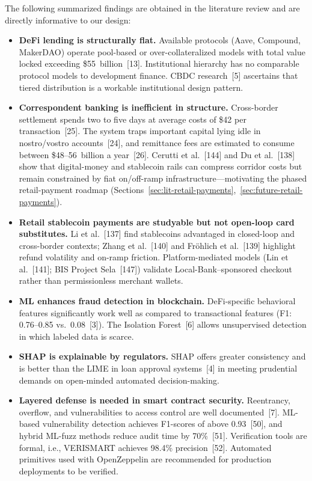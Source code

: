 \documentclass[12pt,a4paper]{report}
\begin{document}
The following summarized findings are obtained in the literature review and are directly informative to our design:

\begin{itemize}[noitemsep]
\item \textbf{DeFi lending is structurally flat.} Available protocols (Aave, Compound, MakerDAO) operate pool-based or over-collateralized models with total value locked exceeding \$55~billion~[13]. Institutional hierarchy has no comparable protocol models to development finance. CBDC research~[5] ascertains that tiered distribution is a workable institutional design pattern.
\item \textbf{Correspondent banking is inefficient in structure.} Cross-border settlement spends two to five days at average costs of \$42 per transaction~[25]. The system traps important capital lying idle in nostro/vostro accounts~[24], and remittance fees are estimated to consume between \$48--56~billion a year~[26]. Cerutti et al.~[144] and Du et al.~[138] show that digital-money and stablecoin rails can compress corridor costs but remain constrained by fiat on/off-ramp infrastructure---motivating the phased retail-payment roadmap (Sections~\ref{sec:lit-retail-payments},~\ref{sec:future-retail-payments}).
\item \textbf{Retail stablecoin payments are studyable but not open-loop card substitutes.} Li et al.~[137] find stablecoins advantaged in closed-loop and cross-border contexts; Zhang et al.~[140] and Fr\"{o}hlich et al.~[139] highlight refund volatility and on-ramp friction. Platform-mediated models (Lin et al.~[141]; BIS Project Sela~[147]) validate Local-Bank--sponsored checkout rather than permissionless merchant wallets.
\item \textbf{ML enhances fraud detection in blockchain.} DeFi-specific behavioral features significantly work well as compared to transactional features (F1: 0.76--0.85 vs.\ 0.08~[3]). The Isolation Forest~[6] allows unsupervised detection in which labeled data is scarce.
\item \textbf{SHAP is explainable by regulators.} SHAP offers greater consistency and is better than the LIME in loan approval systems~[4] in meeting prudential demands on open-minded automated decision-making.
\item \textbf{Layered defense is needed in smart contract security.} Reentrancy, overflow, and vulnerabilities to access control are well documented~[7]. ML-based vulnerability detection achieves F1-scores of above 0.93~[50], and hybrid ML-fuzz methods reduce audit time by 70\%~[51]. Verification tools are formal, i.e., VERISMART achieves 98.4\% precision~[52]. Automated primitives used with OpenZeppelin are recommended for production deployments to be verified.

\end{itemize}
\end{document}
